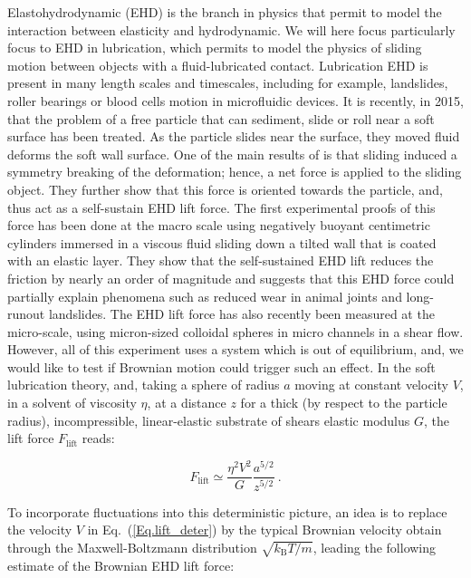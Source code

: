 Elastohydrodynamic (\gls{EHD}) is the branch in physics that permit to model the interaction between elasticity and hydrodynamic. We will here focus particularly focus to \gls{EHD} in lubrication, which permits to model the physics of sliding motion between objects with a fluid-lubricated contact. Lubrication \gls{EHD} is present in many length scales and timescales, including for example, landslides, roller bearings or blood cells motion in microfluidic devices. It is recently, in 2015, that the problem of a free particle that can sediment, slide or roll near a soft surface has been treated. As the particle slides near the surface, they moved fluid deforms the soft wall surface. One of the main results of \cite{Salez} is that sliding induced a symmetry breaking of the deformation; hence, a net force is applied to the sliding object. They further show that this force is oriented towards the particle, and, thus act as a self-sustain \gls{EHD} lift force. The first experimental proofs of this force has been done at the macro scale using negatively buoyant centimetric cylinders immersed in a viscous fluid sliding down a tilted wall that is coated with an elastic layer. They show that the self-sustained \gls{EHD} lift reduces the friction by nearly an order of magnitude and suggests that this \gls{EHD} force could partially explain phenomena such as reduced wear in animal joints and long-runout landslides. The \gls{EHD} lift force has also recently been measured at the micro-scale, using micron-sized colloidal spheres in micro channels in a shear flow. However, all of this experiment uses a system which is out of equilibrium, and, we would like to test if Brownian motion could trigger such an effect. In the soft lubrication theory, and, taking a sphere of radius $a$ moving at constant velocity $V$, in a solvent of viscosity $\eta$, at a distance $z$ for a thick (by respect to the particle radius), incompressible, linear-elastic substrate of shears elastic modulus $G$, the lift force $F_\mathrm{lift}$ reads:

\begin{equation}
	F_\mathrm{lift} \simeq \frac{\eta^2 V^2}{G} \frac{a^{5/2}}{z^{5/2}} ~.
	\label{Eq.lift_deter}
\end{equation}

To incorporate fluctuations into this deterministic picture, an idea is to replace the velocity $V$ in Eq.~(\ref{Eq.lift_deter}) by the typical Brownian velocity obtain through the Maxwell-Boltzmann distribution $\sqrt{k_\mathrm{B}T / m}$, leading the following estimate of the Brownian \gls{EHD} lift force:

